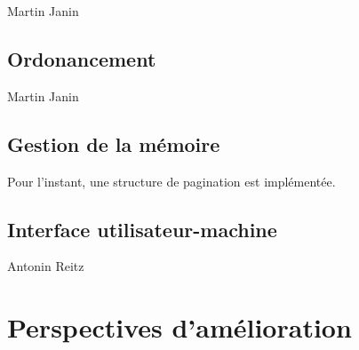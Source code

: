 \documentclass[a4paper,11pt]{article}
\begin{document}
Martin Janin

\subsection{Ordonancement}

Martin Janin

\subsection{Gestion de la mémoire}

Pour l'instant, une structure de pagination est implémentée.

\subsection{Interface utilisateur-machine}

Antonin Reitz

\section{Perspectives d'amélioration}
\end{document}
